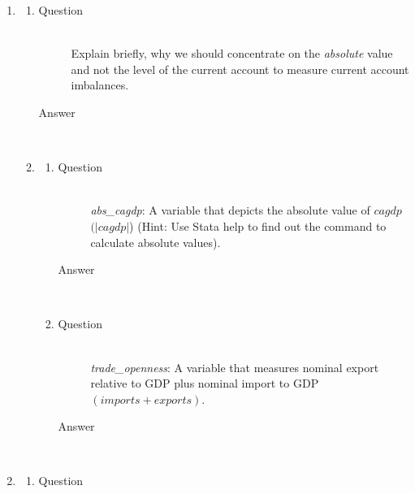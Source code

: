 \documentclass{article}
\begin{document}
\begin{enumerate}

  \item
  \begin{enumerate}[label=(\alph*)]
    \item 
    \begin{description}
      \item[Question] \hfill \\
      Explain briefly, why we should concentrate on the \textit{absolute} value and not the level of the current account to measure current account imbalances.
      \item[Answer] \hfill \\
      
    \end{description}
    \item
    \begin{enumerate}[label=(\roman*)]
      \item 
      \begin{description}
        \item[Question] \hfill \\
        \textit{abs\_cagdp}: A variable that depicts the absolute value of $cagdp$ $ (|cagdp|$) (Hint: Use Stata help to find out the command to calculate absolute values).
        \item[Answer] \hfill \\
        
      \end{description}
      \item 
      \begin{description}
        \item[Question] \hfill \\
        \textit{trade\_openness}: A variable that measures nominal export relative to GDP plus nominal import to GDP $(imports+exports)$.
        \item[Answer] \hfill \\
        
      \end{description}
    \end{enumerate}
  \end{enumerate}
  
  \item
  \begin{enumerate}[label=(\alph*)]
    \item 
    \begin{description}
      \item[Question] \hfill \\


\end{description}
\end{enumerate}
\end{enumerate}
\end{document}
